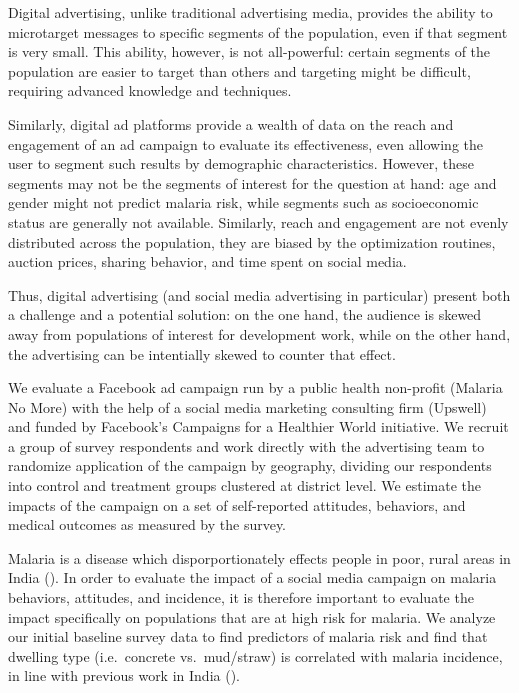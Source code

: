 \documentclass[a4paper,12pt]{article}
\begin{document}
Digital advertising, unlike traditional advertising media, provides the ability to microtarget messages to specific segments of the population, even if that segment is very small. This ability, however, is not all-powerful: certain segments of the population are easier to target than others and targeting might be difficult, requiring advanced knowledge and techniques.

Similarly, digital ad platforms provide a wealth of data on the reach and engagement of an ad campaign to evaluate its effectiveness, even allowing the user to segment such results by demographic characteristics. However, these segments may not be the segments of interest for the question at hand: age and gender might not predict malaria risk, while segments such as socioeconomic status are generally not available. Similarly, reach and engagement are not evenly distributed across the population, they are biased by the optimization routines, auction prices, sharing behavior, and time spent on social media.

Thus, digital advertising (and social media advertising in particular) present both a challenge and a potential solution: on the one hand, the audience is skewed away from populations of interest for development work, while on the other hand, the advertising can be intentially skewed to counter that effect.

We evaluate a Facebook ad campaign run by a public health non-profit (Malaria No More) with the help of a social media marketing consulting firm (Upswell) and funded by Facebook's Campaigns for a Healthier World initiative. We recruit a group of survey respondents and work directly with the advertising team to randomize application of the campaign by geography, dividing our respondents into control and treatment groups clustered at district level. We estimate the impacts of the campaign on a set of self-reported attitudes, behaviors, and medical outcomes as measured by the survey.

Malaria is a disease which disporportionately effects people in poor, rural areas in India (\cite{Dev2004}). In order to evaluate the impact of a social media campaign on malaria behaviors, attitudes, and incidence, it is therefore important to evaluate the impact specifically on populations that are at high risk for malaria. We analyze our initial baseline survey data to find predictors of malaria risk and find that dwelling type (i.e.\ concrete vs.\ mud/straw) is correlated with malaria incidence, in line with previous work in India (\cite{Sharma2015}).
\end{document}
